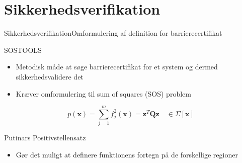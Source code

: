 \section{Sikkerhedsverifikation}
\begin{frame}{Sikkerhedsverifikation}{Omformulering af definition for barrierecertifikat}
\begin{block}{SOSTOOLS}
	\begin{itemize}
		\item Metodisk måde at søge barrierecertifikat for et system og dermed sikkerhedsvalidere det
		\item Kræver omformulering til sum of squares (SOS) problem
	\end{itemize}
\begin{equation*}
p(\mathbf{x})=\sum\limits_{j=1}^{m}f_j^2(\mathbf{x})=\mathbf{z}^T\mathbf{Q}\mathbf{z}\quad \in\Sigma[\mathbf{x}]
\end{equation*}
\end{block}
\begin{block}{Putinars Positivstellensatz}
	\begin{itemize}
		\item Gør det muligt at definere funktionens fortegn på de forskellige regioner
	\end{itemize}
\end{block}
\end{frame}

